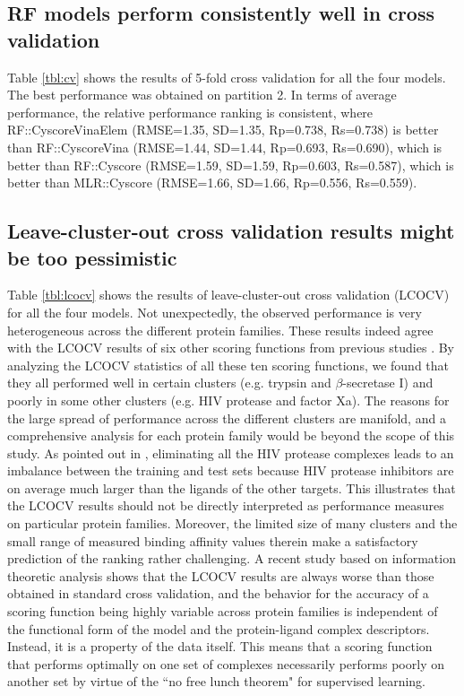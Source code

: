 \documentclass[linenumbers]{bmcart}
\begin{document}
\subsection*{RF models perform consistently well in cross validation}

Table \ref{tbl:cv} shows the results of 5-fold cross validation for all the four models. The best performance was obtained on partition 2. In terms of average performance, the relative performance ranking is consistent, where RF::CyscoreVinaElem (RMSE=1.35, SD=1.35, Rp=0.738, Rs=0.738) is better than RF::CyscoreVina (RMSE=1.44, SD=1.44, Rp=0.693, Rs=0.690), which is better than RF::Cyscore (RMSE=1.59, SD=1.59, Rp=0.603, Rs=0.587), which is better than MLR::Cyscore (RMSE=1.66, SD=1.66, Rp=0.556, Rs=0.559).

\subsection*{Leave-cluster-out cross validation results might be too pessimistic}

Table \ref{tbl:lcocv} shows the results of leave-cluster-out cross validation (LCOCV) for all the four models. Not unexpectedly, the observed performance is very heterogeneous across the different protein families. These results indeed agree with the LCOCV results of six other scoring functions from previous studies \cite{774,1414,1194,1410,1347,1415}. By analyzing the LCOCV statistics of all these ten scoring functions, we found that they all performed well in certain clusters (e.g. trypsin and $\beta$-secretase I) and poorly in some other clusters (e.g. HIV protease and factor Xa). The reasons for the large spread of performance across the different clusters are manifold, and a comprehensive analysis for each protein family would be beyond the scope of this study. As pointed out in \cite{1347}, eliminating all the HIV protease complexes leads to an imbalance between the training and test sets because HIV protease inhibitors are on average much larger than the ligands of the other targets. This illustrates that the LCOCV results should not be directly interpreted as performance measures on particular protein families. Moreover, the limited size of many clusters and the small range of measured binding affinity values therein make a satisfactory prediction of the ranking rather challenging. A recent study \cite{1415} based on information theoretic analysis shows that the LCOCV results are always worse than those obtained in standard cross validation, and the behavior for the accuracy of a scoring function being highly variable across protein families is independent of the functional form of the model and the protein-ligand complex descriptors. Instead, it is a property of the data itself. This means that a scoring function that performs optimally on one set of complexes necessarily performs poorly on another set by virtue of the ``no free lunch theorem" for supervised learning.
\end{document}
